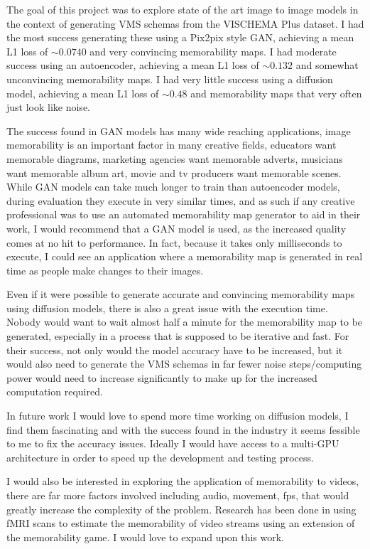 \documentclass{UoYCSproject}
\begin{document}
The goal of this project was to explore state of the art image to image models in the context of generating VMS schemas from the VISCHEMA Plus dataset. I had the most success generating these using a Pix2pix style GAN, achieving a mean L1 loss of \(\sim 0.0740 \) and very convincing memorability maps. I had moderate success using an autoencoder, achieving a mean L1 loss of \(\sim 0.132\) and somewhat unconvincing memorability maps. I had very little success using a diffusion model, achieving a mean L1 loss of \(\sim 0.48 \) and memorability maps that very often just look like noise.

The success found in GAN models has many wide reaching applications, image memorability is an important factor in many creative fields, educators want memorable diagrams, marketing agencies want memorable adverts, musicians want memorable album art, movie and tv producers want memorable scenes. While GAN models can take much longer to train than autoencoder models, during evaluation they execute in very similar times, and as such if any creative professional was to use an automated memorability map generator to aid in their work, I would recommend that a GAN model is used, as the increased quality comes at no hit to performance. In fact, because it takes only milliseconds to execute, I could see an application where a memorability map is generated in real time as people make changes to their images.

Even if it were possible to generate accurate and convincing memorability maps using diffusion models, there is also a great issue with the execution time. Nobody would want to wait almost half a minute for the memorability map to be generated, especially in a process that is supposed to be iterative and fast. For their success, not only would the model accuracy have to be increased, but it would also need to generate the VMS schemas in far fewer noise steps/computing power would need to increase significantly to make up for the increased computation required. 

In future work I would love to spend more time working on diffusion models, I find them fascinating and with the success found in the industry \cite{ramesh2022hierarchical, saharia2022photorealistic} it seems fessible to me to fix the accuracy issues. Ideally I would have access to a multi-GPU architecture in order to speed up the development and testing process.

I would also be interested in exploring the application of memorability to videos, there are far more factors involved including audio, movement, fps, that would greatly increase the complexity of the problem. Research has been done in \cite{HASSON2004, HASSONNeurocinematics, HASSON2008, fMRIPredictions} using fMRI scans to estimate the memorability of video streams using an extension of the memorability game. I would love to expand upon this work.
\end{document}
